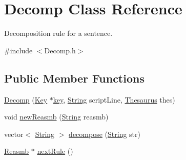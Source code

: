 \hypertarget{classDecomp}{}\section{Decomp Class Reference}
\label{classDecomp}


Decomposition rule for a sentence.  




{\ttfamily \#include $<$Decomp.\+h$>$}

\subsection*{Public Member Functions}
\begin{DoxyCompactItemize}
\item 
\mbox{\hyperlink{classDecomp_a01a72f90b40f1f7ba98349443f3d0b1c}{Decomp}} (\mbox{\hyperlink{classKey}{Key}} $\ast$\mbox{\hyperlink{classDecomp_aac5121057365009504733971b61b5144}{key}}, \mbox{\hyperlink{classString}{String}} script\+Line, \mbox{\hyperlink{classThesaurus}{Thesaurus}} thes)
\item 
void \mbox{\hyperlink{classDecomp_a8ff1983b817d90d03b5f2726cc2e7af8}{new\+Reasmb}} (\mbox{\hyperlink{classString}{String}} reasmb)
\item 
vector$<$ \mbox{\hyperlink{classString}{String}} $>$ \mbox{\hyperlink{classDecomp_a5778e75423e33df37fe2e41157d3bc03}{decompose}} (\mbox{\hyperlink{classString}{String}} str)
\item 
\mbox{\hyperlink{classReasmb}{Reasmb}} $\ast$ \mbox{\hyperlink{classDecomp_ae3a21380fd65ef17ca0c1b4bb4aa7875}{next\+Rule}} ()
\end{DoxyCompactItemize}
